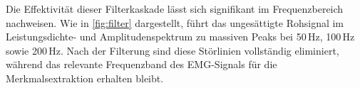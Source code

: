         Die Effektivität dieser Filterkaskade lässt sich signifikant im Frequenzbereich nachweisen. Wie in \autoref{fig:filter} dargestellt, führt das ungesättigte Rohsignal im Leistungsdichte- und Amplitudenspektrum zu massiven Peaks bei 50\,Hz, 100\,Hz sowie 200\,Hz. Nach der Filterung sind diese Störlinien vollständig eliminiert, während das relevante Frequenzband des \ac{EMG}-Signals für die Merkmalsextraktion erhalten bleibt.
